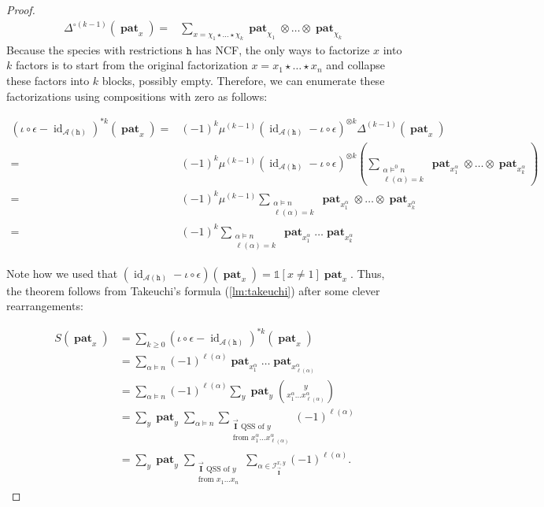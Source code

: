\documentclass[12pt, reqno]{amsart}
\theoremstyle{definition}
\newcommand{\III}{\vec{\mathbf{I}}}
\DeclareMathOperator{\id}{id}
\DeclareMathOperator{\pat}{\mathbf{pat}}
\begin{document}
\begin{proof}
\begin{align*}
\Delta^{\circ (k-1)} (\pat_x)
    =& \sum_{x = \chi_1 \star \dots \star \chi_k} \pat_{\chi_1}\otimes \dots \otimes \pat_{\chi_k}
\end{align*}
Because the species with restrictions $\mathtt{h}$ has NCF, the only ways to factorize $x$ into $k$ factors is to start from the original factorization $x = x_1 \star \dots \star x_n$ and collapse these factors into $k$ blocks, possibly empty.
Therefore, we can enumerate these factorizations using compositions with zero as follows:

\begin{align*}
(\iota \circ \epsilon -  \id_{\mathcal A (\mathtt{h})})^{*k} (\pat_x)
    =& (-1)^k  \mu^{(k-1)}( \id_{\mathcal A (\mathtt{h})} - \iota \circ \epsilon)^{\otimes k} \Delta^{(k-1)} (\pat_x)\\
    =& (-1)^k  \mu^{(k-1)}( \id_{\mathcal A (\mathtt{h})} - \iota \circ \epsilon)^{\otimes k}\left(\sum_{\substack{\alpha\models^0 n \\ \ell(\alpha) = k}} \pat_{x^{\alpha}_1} \otimes \dots \otimes \pat_{x^{\alpha}_k} \right) \\
    =&  (-1)^k  \mu^{(k-1)} \sum_{\substack{\alpha\models n \\ \ell(\alpha) = k}}  \pat_{x^{\alpha}_1} \otimes \dots \otimes \pat_{x^{\alpha}_k}\\
    =&  (-1)^k \sum_{\substack{\alpha\models n \\ \ell(\alpha) = k}}  \pat_{x^{\alpha}_1}  \dots \pat_{x^{\alpha}_k}
\end{align*}

Note how we used that $(\id_{\mathcal A (\mathtt{h})} - \iota \circ \epsilon ) (\pat_x) = \mathbb{1}[x \neq 1]\pat_x$.
Thus, the theorem follows from Takeuchi's formula (\cref{lm:takeuchi}) after some clever rearrangements:

\begin{align*}
S(\pat_x)&= \sum_{k\geq 0 } (\iota \circ \epsilon -  \id_{\mathcal A (\mathtt{h})})^{*k} (\pat_x) \\
         &= \sum_{\alpha \models n} (-1)^{\ell(\alpha)} \pat_{x^{\alpha}_1} \dots \pat_{x^{\alpha}_{\ell(\alpha)}}\\
         &= \sum_{\alpha \models n } (-1)^{\ell(\alpha)} \sum_y \pat_y \binom{y}{x^{\alpha}_1 \dots x^{\alpha}_{\ell(\alpha)}}\\
         &= \sum_y \pat_y \sum_{\alpha \models n} \sum_{  \substack{\III \text{ QSS of $y$}\\ \text{from }x^{\alpha}_1 \dots x^{\alpha}_{\ell(\alpha)} }} (-1)^{\ell(\alpha)}\\
         &= \sum_y \pat_y \sum_{  \substack{\III \text{ QSS of $y$}\\ \text{from }x_1 \dots x_n }} \sum_{\alpha \in \mathcal I^{x, y}_{\III}} (-1)^{\ell(\alpha)}.
\end{align*}


\end{proof}
\end{document}
